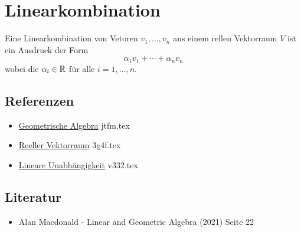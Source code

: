 \documentclass{sajzk}
\begin{document}
\section{Linearkombination}
\label{yjez}
Eine Linearkombination von Vetoren $v_1, ..., v_n$ aus einem rellen
Vektorraum $V$ ist ein Ausdruck der Form
\[
\alpha_1 v_1 + \cdots + \alpha_n v_n
\]
wobei die $\alpha_i \in \mathbb{R}$ für alle $i = 1, ..., n$.

\subsection{Referenzen}
\begin{itemize}
    \item \href{jtfm.pdf}{Geometrische Algebra} jtfm.tex
    \item \href{3g4f.pdf}{Reeller Vektorraum} 3g4f.tex
    \item \href{v332.pdf}{Lineare Unabhängigkeit} v332.tex
\end{itemize}

\subsection{Literatur}
\begin{itemize}
    \item Alan Macdonald - Linear and Geometric Algebra (2021) Seite 22
\end{itemize}
\end{document}
